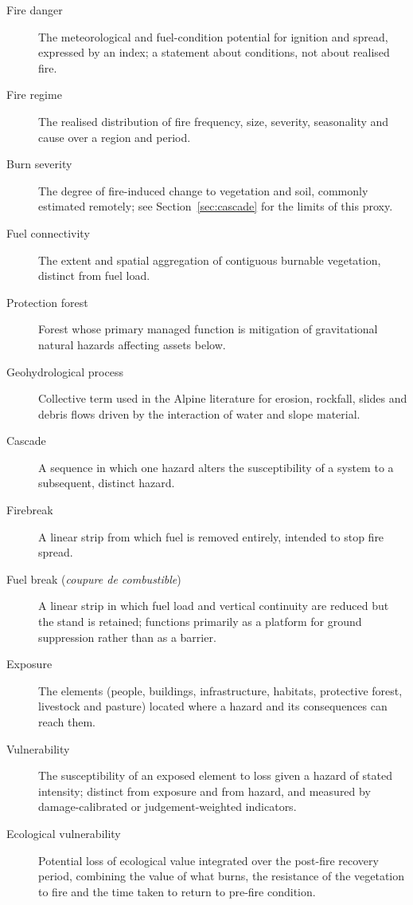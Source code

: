 \documentclass[11pt,a4paper]{article}
\begin{document}
\begin{description}
    \item[Fire danger] The meteorological and fuel-condition potential for ignition and spread, expressed by an index; a statement about conditions, not about realised fire.
    \item[Fire regime] The realised distribution of fire frequency, size, severity, seasonality and cause over a region and period.
    \item[Burn severity] The degree of fire-induced change to vegetation and soil, commonly estimated remotely; see Section~\ref{sec:cascade} for the limits of this proxy.
    \item[Fuel connectivity] The extent and spatial aggregation of contiguous burnable vegetation, distinct from fuel load.
    \item[Protection forest] Forest whose primary managed function is mitigation of gravitational natural hazards affecting assets below.
    \item[Geohydrological process] Collective term used in the Alpine literature for erosion, rockfall, slides and debris flows driven by the interaction of water and slope material.
    \item[Cascade] A sequence in which one hazard alters the susceptibility of a system to a subsequent, distinct hazard.
    \item[Firebreak] A linear strip from which fuel is removed entirely, intended to stop fire spread.
    \item[Fuel break (\emph{coupure de combustible})] A linear strip in which fuel load and vertical continuity are reduced but the stand is retained; functions primarily as a platform for ground suppression rather than as a barrier.
    \item[Exposure] The elements (people, buildings, infrastructure, habitats, protective forest, livestock and pasture) located where a hazard and its consequences can reach them.
    \item[Vulnerability] The susceptibility of an exposed element to loss given a hazard of stated intensity; distinct from exposure and from hazard, and measured by damage-calibrated or judgement-weighted indicators.
    \item[Ecological vulnerability] Potential loss of ecological value integrated over the post-fire recovery period, combining the value of what burns, the resistance of the vegetation to fire and the time taken to return to pre-fire condition.
\end{description}




\end{document}
